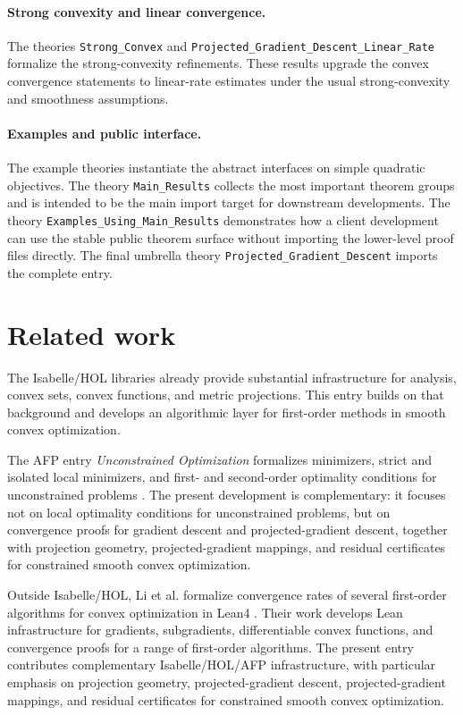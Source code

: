 \documentclass[11pt,a4paper]{article}
\begin{document}
\paragraph{Strong convexity and linear convergence.}
The theories \texttt{Strong\_Convex} and \texttt{Projected\_Gradient\_Descent\_Linear\_Rate} formalize the strong-convexity refinements.
These results upgrade the convex convergence statements to linear-rate estimates under the usual strong-convexity and smoothness assumptions.

\paragraph{Examples and public interface.}
The example theories instantiate the abstract interfaces on simple quadratic objectives.
The theory \texttt{Main\_Results} collects the most important theorem groups and is intended to be the main import target for downstream developments.
The theory \texttt{Examples\_Using\_Main\_Results} demonstrates how a client development can use the stable public theorem surface without importing the lower-level proof files directly.
The final umbrella theory \texttt{Projected\_Gradient\_Descent} imports the complete entry.

\section{Related work}

The Isabelle/HOL libraries already provide substantial infrastructure for analysis, convex sets, convex functions, and metric projections.
This entry builds on that background and develops an algorithmic layer for first-order methods in smooth convex optimization.

The AFP entry \emph{Unconstrained Optimization} formalizes minimizers, strict and isolated local minimizers, and first- and second-order optimality conditions for unconstrained problems \cite{UnconstrainedOptimizationAFP}.
The present development is complementary: it focuses not on local optimality conditions for unconstrained problems, but on convergence proofs for gradient descent and projected-gradient descent, together with projection geometry, projected-gradient mappings, and residual certificates for constrained smooth convex optimization.

Outside Isabelle/HOL, Li et al. formalize convergence rates of several first-order algorithms for convex optimization in Lean4 \cite{FirstOrderMethodsLean}.
Their work develops Lean infrastructure for gradients, subgradients, differentiable convex functions, and convergence proofs for a range of first-order algorithms.
The present entry contributes complementary Isabelle/HOL/AFP infrastructure, with particular emphasis on projection geometry, projected-gradient descent, projected-gradient mappings, and residual certificates for constrained smooth convex optimization.
\end{document}
